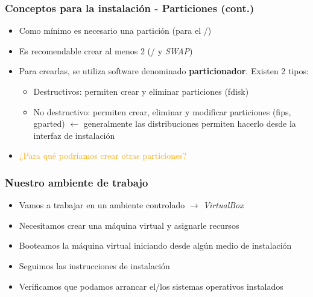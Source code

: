 \begin{frame}
	\frametitle{Conceptos para la instalación - Particiones (cont.)}
	\begin{itemize}
		\item Como mínimo es necesario una partición (para el /)
		\item Es recomendable crear al menos 2 (/ y \textit{SWAP})
		\item Para crearlas, se utiliza software denominado \textbf{particionador}. Existen 2 tipos:
		\begin{itemize}
			\item Destructivos: permiten crear y eliminar particiones (fdisk)
			\item No destructivo: permiten crear, eliminar y modificar particiones (fips, gparted) $\leftarrow$ generalmente las distribuciones permiten hacerlo desde la interfaz de instalación
		\end{itemize}
		\pause
		\item \textcolor{orange}{¿Para qué podríamos crear otras particiones?}
	\end{itemize}
\end{frame}

\begin{frame}
	\frametitle{Nuestro ambiente de trabajo}
	\begin{itemize}
		\item Vamos a trabajar en un ambiente controlado $\rightarrow$ \emph{VirtualBox}
		\item Necesitamos crear una máquina virtual y asignarle recursos
		\item Booteamos la máquina virtual iniciando desde algún medio de instalación
		\item Seguimos las instrucciones de instalación
		\item Verificamos que podamos arrancar el/los sistemas operativos instalados
	\end{itemize}
\end{frame}

